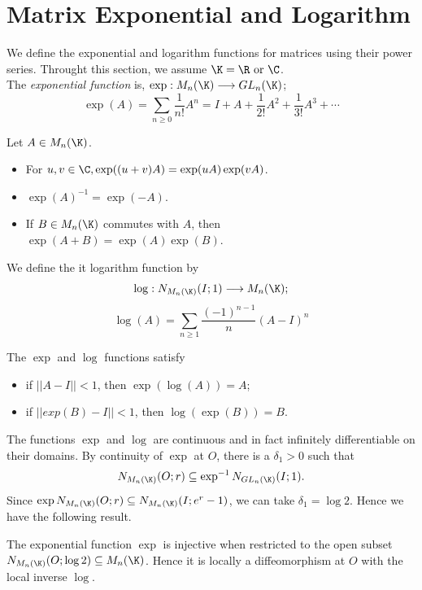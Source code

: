 \section{Matrix Exponential and Logarithm}

We define the exponential and logarithm functions for matrices using their power series.
Throught this section, we assume \(\K=\R\text{ or }\C\).
\\

The {\it exponential function} is, \(\exp:M_n(\K)\longrightarrow GL_n(\K)\);
\[ \exp(A)=\sum_{n\ge0}\frac{1}{n!}A^n=I+A+\frac{1}{2!}A^2+\frac{1}{3!}A^3+\cdots \]

\begin{proposition}
  Let \(A\in M_n(\K)\).
  \begin{itemize}
    \item[\((i)\)] For \(u,v\in\C, \exp((u+v)A)=\exp(uA)\exp(vA)\).
    \item[\((ii)\)] \(\exp(A)^{-1}=\exp(-A).\)
    \item[\((iii)\)] If \(B\in M_n(\K)\) commutes with \(A\), then \(\exp(A+B)=\exp(A)\exp(B)\).
  \end{itemize}
\end{proposition}

We define the {it logarithm function} by
\[ \log:N_{M_n(\K)}(I;1)\longrightarrow M_n(\K); \]
\[ \log(A)=\sum_{n\ge1}\frac{(-1)^{n-1}}{n}(A-I)^n \]

\begin{proposition}
  The \(\exp\) and \(\log\) functions satisfy
  \begin{itemize}
    \item[\((i)\)] if \(||A-I||<1\), then \(\exp(\log(A))=A\);
    \item[\((ii)\)] if \(||exp(B)-I||<1\), then \(\log(\exp(B))=B\).
  \end{itemize}
\end{proposition}

The functions \(\exp\) and \(\log\) are continuous and in fact infinitely differentiable
on their domains. By continuity of \(\exp\) at \(O\), there is a \(\delta_1>0\) such that
\[ N_{M_n(\K)}(O;r)\subseteq\exp^{-1}N_{GL_n(\K)}(I;1). \]
Since \(\exp N_{M_n(\K)}(O;r)\subseteq N_{M_n(\K)}(I;e^r-1)\), we can take \(\delta_1=\log 2\).
Hence we have the following result.

\begin{proposition}
  The exponential function \(\exp\) is injective when restricted to the open subset
  \(N_{M_n(\K)}(O;\log2)\subseteq M_n(\K)\). Hence it is locally a diffeomorphism at \(O\) with the
  local inverse \(\log\).
\end{proposition}

